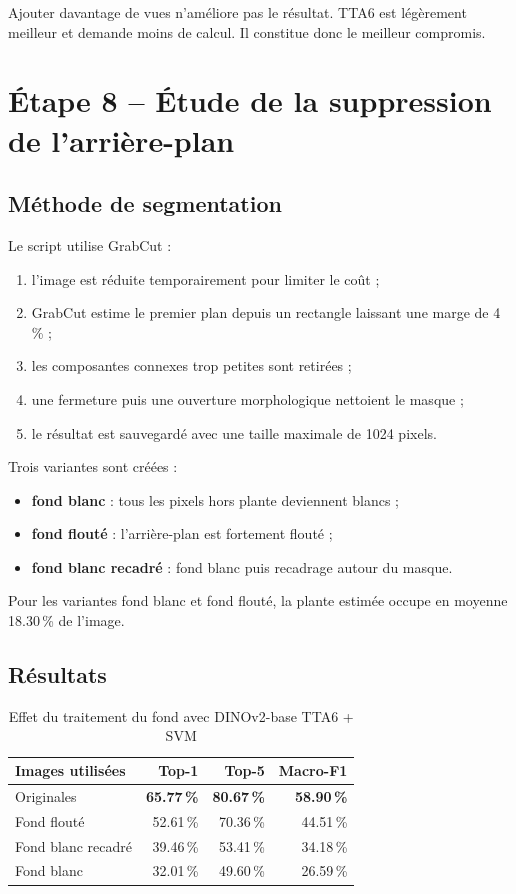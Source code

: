 \documentclass[12pt,a4paper]{report}
\newcommand{\fichier}[1]{\texttt{\detokenize{#1}}}
\newcommand{\pct}[1]{\num{#1}\,\%}
\begin{document}
Ajouter davantage de vues n'améliore pas le résultat. TTA6 est légèrement meilleur et demande moins de calcul. Il constitue donc le meilleur compromis.

\chapter{Étape 8 -- Étude de la suppression de l'arrière-plan}

\section{Méthode de segmentation}

Le script \fichier{preprocess_background.py} utilise GrabCut :
\begin{enumerate}
  \item l'image est réduite temporairement pour limiter le coût ;
  \item GrabCut estime le premier plan depuis un rectangle laissant une marge de \pct{4} ;
  \item les composantes connexes trop petites sont retirées ;
  \item une fermeture puis une ouverture morphologique nettoient le masque ;
  \item le résultat est sauvegardé avec une taille maximale de 1024 pixels.
\end{enumerate}

Trois variantes sont créées :
\begin{itemize}
  \item \textbf{fond blanc} : tous les pixels hors plante deviennent blancs ;
  \item \textbf{fond flouté} : l'arrière-plan est fortement flouté ;
  \item \textbf{fond blanc recadré} : fond blanc puis recadrage autour du masque.
\end{itemize}

Pour les variantes fond blanc et fond flouté, la plante estimée occupe en moyenne \pct{18,30} de l'image.

\section{Résultats}

\begin{table}[H]
\centering
\caption{Effet du traitement du fond avec DINOv2-base TTA6 + SVM}
\begin{tabular}{lrrr}
\toprule
\textbf{Images utilisées} & \textbf{Top-1} & \textbf{Top-5} & \textbf{Macro-F1}\\
\midrule
Originales & \textbf{\pct{65,77}} & \textbf{\pct{80,67}} & \textbf{\pct{58,90}}\\
Fond flouté & \pct{52,61} & \pct{70,36} & \pct{44,51}\\
Fond blanc recadré & \pct{39,46} & \pct{53,41} & \pct{34,18}\\
Fond blanc & \pct{32,01} & \pct{49,60} & \pct{26,59}\\
\bottomrule
\end{tabular}
\end{table}
\end{document}
